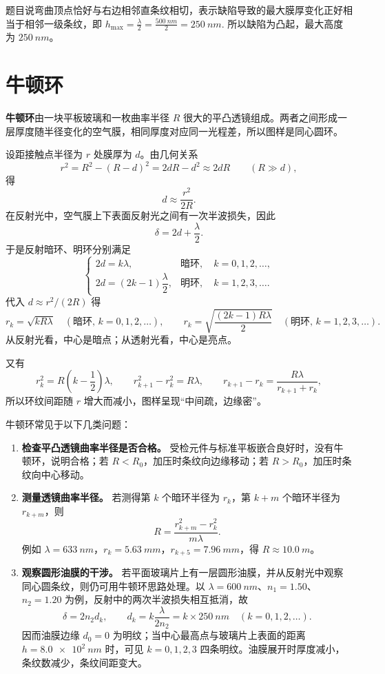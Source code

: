 \documentclass[lang=cn,11pt]{elegantbook}
\begin{document}
\begin{solution}
题目说弯曲顶点恰好与右边相邻直条纹相切，表示缺陷导致的最大膜厚变化正好相当于相邻一级条纹，即
 \(h_{\max}=\frac{\lambda}{2} =\frac{\SI{500}{nm}}{2} =\SI{250}{nm}.\) 
所以缺陷为凸起，最大高度为 \(\SI{250}{nm}\)。
\end{solution}

\section{牛顿环}

\begin{conclusion}[牛顿环]
\textbf{牛顿环}由一块平板玻璃和一枚曲率半径 \(R\) 很大的平凸透镜组成。两者之间形成一层厚度随半径变化的空气膜，相同厚度对应同一光程差，所以图样是同心圆环。

设距接触点半径为 \(r\) 处膜厚为 \(d\)。由几何关系
\[
r^2=R^2-(R-d)^2=2dR-d^2\approx 2dR\qquad(R\gg d),
\]
得
\[
d\approx \frac{r^2}{2R}.
\]
在反射光中，空气膜上下表面反射光之间有一次半波损失，因此
\[
\delta=2d+\frac{\lambda}{2}.
\]
于是反射暗环、明环分别满足
\[
\begin{cases}
2d=k\lambda, & \text{暗环},\quad k=0,1,2,\dots,\\[4pt]
2d=(2k-1)\dfrac{\lambda}{2}, & \text{明环},\quad k=1,2,3,\dots.
\end{cases}
\]
代入 \(d\approx r^2/(2R)\) 得
\[
r_k=\sqrt{kR\lambda}\quad(\text{暗环},\,k=0,1,2,\dots),\qquad
r_k=\sqrt{\frac{(2k-1)R\lambda}{2}}\quad(\text{明环},\,k=1,2,3,\dots).
\]
从反射光看，中心是暗点；从透射光看，中心是亮点。

又有
\[
r_k^2=R\left(k-\frac12\right)\lambda,\qquad
r_{k+1}^2-r_k^2=R\lambda,\qquad
r_{k+1}-r_k=\frac{R\lambda}{r_{k+1}+r_k},
\]
所以环纹间距随 \(r\) 增大而减小，图样呈现“中间疏，边缘密”。

牛顿环常见于以下几类问题：
\begin{enumerate}
  \item \textbf{检查平凸透镜曲率半径是否合格。} 受检元件与标准平板嵌合良好时，没有牛顿环，说明合格；若 \(R<R_0\)，加压时条纹向边缘移动；若 \(R>R_0\)，加压时条纹向中心移动。
  \item \textbf{测量透镜曲率半径。} 若测得第 \(k\) 个暗环半径为 \(r_k\)，第 \(k+m\) 个暗环半径为 \(r_{k+m}\)，则
  \[
  R=\frac{r_{k+m}^2-r_k^2}{m\lambda}.
  \]
  例如 \(\lambda=\SI{633}{nm}\)，\(r_k=\SI{5.63}{mm}\)，\(r_{k+5}=\SI{7.96}{mm}\)，得 \(R\approx\SI{10.0}{m}\)。
  \item \textbf{观察圆形油膜的干涉。} 若平面玻璃片上有一层圆形油膜，并从反射光中观察同心圆条纹，则仍可用牛顿环思路处理。以 \(\lambda=\SI{600}{nm}\)、\(n_1=1.50\)、\(n_2=1.20\) 为例，反射中的两次半波损失相互抵消，故
  \[
  \delta=2n_2d_k,\qquad d_k=k\frac{\lambda}{2n_2}=k\times\SI{250}{nm}\quad(k=0,1,2,\dots).
  \]
  因而油膜边缘 \(d_0=0\) 为明纹；当中心最高点与玻璃片上表面的距离 \(h=\SI{8.0e2}{nm}\) 时，可见 \(k=0,1,2,3\) 四条明纹。油膜展开时厚度减小，条纹数减少，条纹间距变大。
\end{enumerate}
\end{conclusion}
\end{document}

